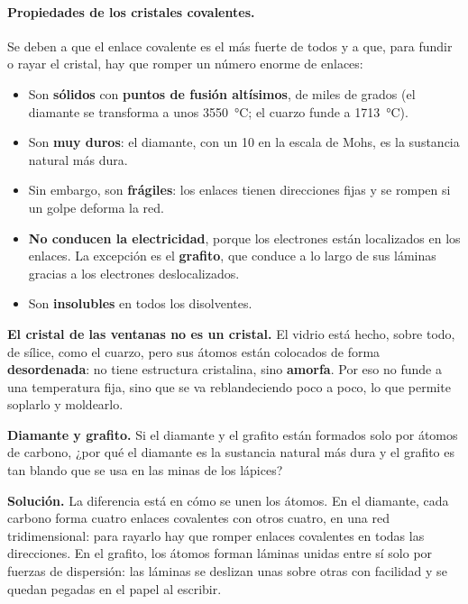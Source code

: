 \paragraph{Propiedades de los cristales covalentes.} Se deben a que el enlace covalente es el más fuerte de todos y a que, para
fundir o rayar el cristal, hay que romper un número enorme de enlaces:
\begin{itemize}
    \item Son \textbf{sólidos} con \textbf{puntos de fusión altísimos}, de miles de grados (el diamante se transforma a unos
    \qty{3550}{\degreeCelsius}; el cuarzo funde a \qty{1713}{\degreeCelsius}).
    \item Son \textbf{muy duros}: el diamante, con un 10 en la escala de Mohs, es la sustancia natural más dura.
    \item Sin embargo, son \textbf{frágiles}: los enlaces tienen direcciones fijas y se rompen si un golpe deforma la red.
    \item \textbf{No conducen la electricidad}, porque los electrones están localizados en los enlaces. La excepción es el
    \textbf{grafito}, que conduce a lo largo de sus láminas gracias a los electrones deslocalizados.
    \item Son \textbf{insolubles} en todos los disolventes.
\end{itemize}

\begin{remark}
    \textbf{El cristal de las ventanas no es un cristal.} El vidrio está hecho, sobre todo, de sílice, como el cuarzo, pero sus
    átomos están colocados de forma \textbf{desordenada}: no tiene estructura cristalina, sino \textbf{amorfa}. Por eso no funde a una
    temperatura fija, sino que se va reblandeciendo poco a poco, lo que permite soplarlo y moldearlo.
\end{remark}

\begin{example}
    \textbf{Diamante y grafito.} Si el diamante y el grafito están formados solo por átomos de carbono, ¿por qué el diamante es la
    sustancia natural más dura y el grafito es tan blando que se usa en las minas de los lápices?

    \textbf{Solución.} La diferencia está en cómo se unen los átomos. En el diamante, cada carbono forma cuatro enlaces covalentes
    con otros cuatro, en una red tridimensional: para rayarlo hay que romper enlaces covalentes en todas las direcciones. En el
    grafito, los átomos forman láminas unidas entre sí solo por fuerzas de dispersión: las láminas se deslizan unas sobre otras con
    facilidad y se quedan pegadas en el papel al escribir.
\end{example}

